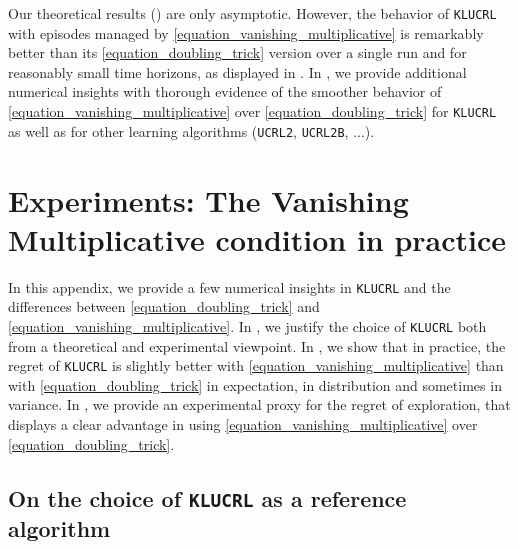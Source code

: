 \documentclass[preprint,cleveref,12pt]{colt2025}
\begin{document}
    Our theoretical results () are only asymptotic. However, the behavior of \texttt{KLUCRL} with episodes managed by \eqref{equation_vanishing_multiplicative} is remarkably better than its \eqref{equation_doubling_trick} version over a single run and for reasonably small time horizons, as displayed in .
    In , we provide additional numerical insights with thorough evidence of the smoother behavior of \eqref{equation_vanishing_multiplicative} over \eqref{equation_doubling_trick} for \texttt{KLUCRL} as well as for other learning algorithms (\texttt{UCRL2},  \texttt{UCRL2B}, ...).

    \acks{-}

    

    \appendix
    \allowdisplaybreaks


    \clearpage
    \section{Experiments: The Vanishing Multiplicative condition in practice}
    \label{appendix_experiments}

    In this appendix, we provide a few numerical insights in \texttt{KLUCRL} and the differences between \eqref{equation_doubling_trick} and \eqref{equation_vanishing_multiplicative}. 
    In , we justify the choice of \texttt{KLUCRL} both from a theoretical and experimental viewpoint. 
    In , we show that in practice, the regret of \texttt{KLUCRL} is slightly better with \eqref{equation_vanishing_multiplicative} than with \eqref{equation_doubling_trick} in expectation, in distribution and sometimes in variance.
    In , we provide an experimental proxy for the regret of exploration, that displays a clear advantage in using \eqref{equation_vanishing_multiplicative} over \eqref{equation_doubling_trick}.

    \subsection{On the choice of \texttt{KLUCRL} as a reference algorithm}
    \label{appendix_choice_klucrl}
\end{document}
